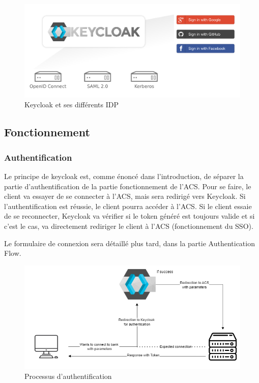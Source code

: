 \begin{figure}[H]
    \centering
    \includegraphics[width=\textwidth]{./img/Keycloak-Identity-Provider.png}
    \caption{Keycloak et ses différents IDP}
    \label{fig:keycloak_idp}
\end{figure}

\subsection{Fonctionnement}

\subsubsection{Authentification}

Le principe de keycloak est, comme énoncé dans l'introduction, de séparer la partie d'authentification
de la partie fonctionnement de l'ACS. Pour se faire, le client va essayer de se connecter à l'ACS, mais
sera redirigé vers Keycloak. Si l'authentification est réussie, le client pourra accéder à l'ACS. Si le client
essaie de se reconnecter, Keycloak va vérifier si le token généré est toujours valide et si c'est le cas, va
directement rediriger le client à l'ACS (fonctionnement du SSO).

Le formulaire de connexion sera détaillé plus tard, dans la partie Authentication Flow.

\begin{figure}[H]
    \centering
    \includegraphics[width=\textwidth]{./img/Keycloak-Authentication-Process.png}
    \caption{Processus d'authentification}
    \label{fig:keycloak_auth}
\end{figure}


